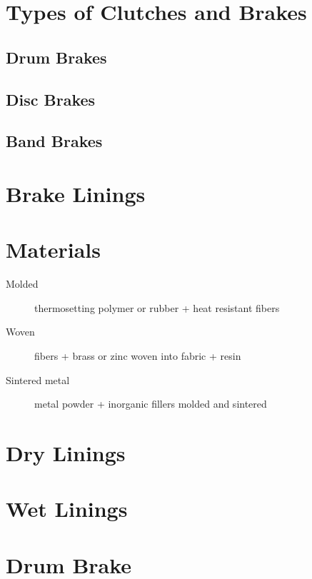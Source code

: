 \documentclass[a4paper,openany]{tufte-book}
\begin{document}
\section{Types of Clutches and Brakes}
\label{sec:orgf7a00d7}
\subsection{Drum Brakes}
\label{sec:org72871dd}


\subsection{Disc Brakes}
\label{sec:orgcb67a39}


\subsection{Band Brakes}
\label{sec:org9c1ae61}


\section{Brake Linings}
\label{sec:org1689e44}
\section{Materials}
\label{sec:orgf1e73fa}
\begin{description}
\item[{Molded}] thermosetting polymer or rubber + heat resistant fibers

\item[{Woven}] fibers + brass or zinc woven into fabric + resin

\item[{Sintered metal}] metal powder + inorganic fillers molded and sintered
\end{description}

\section{Dry Linings}
\label{sec:orga4785d3}


\section{Wet Linings}
\label{sec:org535f6a3}


\section{Drum Brake}
\label{sec:org86b3b44}
\end{document}
